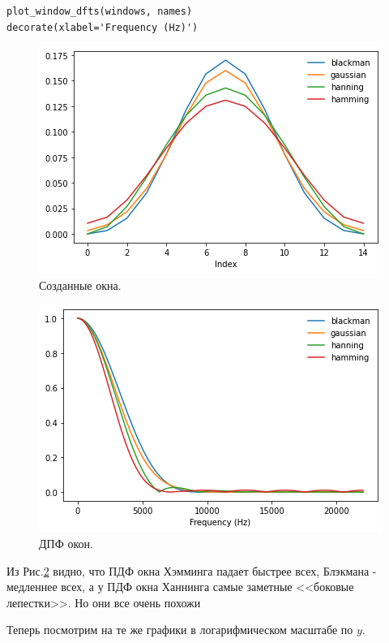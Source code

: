 \documentclass[a4paper, 14pt]{extarticle}
\begin{document}
    \begin{lstlisting}[caption= Получение ДПФ окон., label={lst:task3_windows_dft}]
plot_window_dfts(windows, names)
decorate(xlabel='Frequency (Hz)')   \end{lstlisting}

    \begin{figure}[H]
        \centering
        \includegraphics[width=0.8\linewidth]{resources/Images/task3_windows}
        \caption{Созданные окна.}
        \label{fig:task3_windows}
    \end{figure}

    \begin{figure}[H]
        \centering
        \includegraphics[width=0.8\linewidth]{resources/Images/task3_windows_dft}
        \caption{ДПФ окон.}
        \label{fig:task3_windows_dft}
    \end{figure}

    Из Рис.\ref{fig:task3_windows_dft} видно, что ПДФ окна Хэмминга падает быстрее всех, Блэкмана - медленнее всех,
    а у ПДФ окна Ханнинга самые заметные <<боковые лепестки>>. Но они все очень похожи

    Теперь посмотрим на те же графики в логарифмическом масштабе по $y$.
\end{document}
